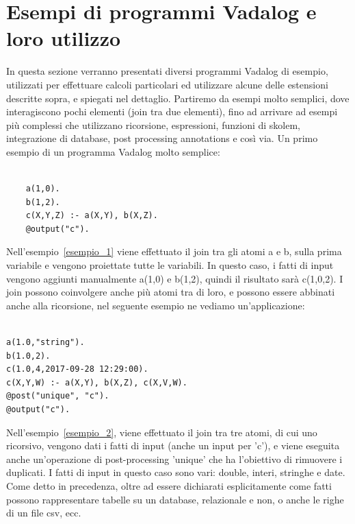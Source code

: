 \section{Esempi di programmi Vadalog e loro utilizzo}

In questa sezione verranno presentati diversi programmi Vadalog di esempio, utilizzati per effettuare calcoli particolari ed utilizzare alcune delle estensioni descritte sopra, e spiegati nel dettaglio. \newline
Partiremo da esempi molto semplici, dove interagiscono pochi elementi (join tra due elementi), fino ad arrivare ad esempi più complessi che utilizzano ricorsione, espressioni, funzioni di skolem, integrazione di database, post processing annotations e così via. \newline
Un primo esempio di un programma Vadalog molto semplice:
\begin{example}\label{esempio_1}
\begin{lstlisting}

	a(1,0). 
	b(1,2). 
	c(X,Y,Z) :- a(X,Y), b(X,Z). 
	@output("c").
\end{lstlisting}
\end{example}
Nell'esempio~\ref{esempio_1} viene effettuato il join tra gli atomi a e b, sulla prima variabile e vengono proiettate tutte le variabili. In questo caso, i fatti di input vengono aggiunti manualmente a(1,0) e b(1,2), quindi il risultato sarà c(1,0,2). \newline
I join possono coinvolgere anche più atomi tra di loro, e possono essere abbinati anche alla ricorsione, nel seguente esempio ne vediamo un'applicazione:
\begin{example}\label{esempio_2}
\begin{lstlisting}

a(1.0,"string"). 
b(1.0,2). 
c(1.0,4,2017-09-28 12:29:00). 
c(X,Y,W) :- a(X,Y), b(X,Z), c(X,V,W). 
@post("unique", "c"). 
@output("c").
\end{lstlisting}
\end{example} 
Nell'esempio~\ref{esempio_2}, viene effettuato il join tra tre atomi, di cui uno ricorsivo, vengono dati i fatti di input (anche un input per 'c'), e viene eseguita anche un'operazione di post-processing 'unique' che ha l'obiettivo di rimuovere i duplicati. \newline
I fatti di input in questo caso sono vari: double, interi, stringhe e date. Come detto in precedenza, oltre ad essere dichiarati esplicitamente come fatti possono rappresentare tabelle su un database, relazionale e non, o anche le righe di un file csv, ecc. \newline
